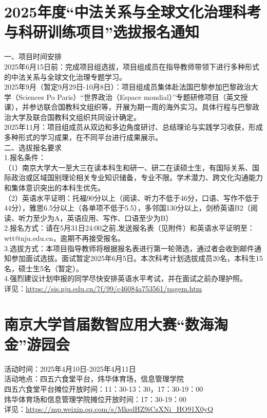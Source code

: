 \documentclass[letterpaper, 12pt]{article}
\begin{document}
\begin{multicols}{2}
\section{2025年度“中法关系与全球文化治理科考与科研训练项目”选拔报名通知}
一、项目时间安排
\\2025年6月15日前：完成项目组选拔，项目组成员在指导教师带领下进行多种形式的中法关系与全球文化治理专题学习。
\\2025年9月（暂定9月29日-10月8日）：项目组成员集体赴法国巴黎参加巴黎政治大学（Sciences Po Paris）“世界政治（Espace mondial）”专题研修项目（英文授课），并参访联合国教科文组织等，开展为期一周的海外实习。具体行程与巴黎政治大学及联合国教科文组织共同设计确定。
\\2025年11月：项目组成员从双边和多边角度研讨、总结理论与实践学习收获，形成多种形式的学习成果，在不同平台进行成果展示。
\\二、选拔报名要求
\\1.报名条件：
\\（1）南京大学大一至大三在读本科生和研一、研二在读硕士生，有国际关系、国际政治或区域国别理论相关专业知识储备，专业不限。学术潜力、跨文化沟通能力和集体意识突出的本科生优先。
\\（2）英语水平证明：托福90分以上（阅读、听力不低于46分，口语、写作不低于44分），雅思6.5分以上（各单项不低于5.5），多邻国130分以上，剑桥英语B2（阅读、听力至少为A，英语应用、写作、口语至少为B）
\\2.报名方式：请在5月31日24:00之前,发送报名表（见附件）和英语水平证明至：wtt@nju.edu.cn，逾期不再接受报名。
\\3.选拔方式：本项目指导教师将根据报名表进行第一轮筛选，通过者会收到邮件通知参加面试选拔。面试暂定2025年6月5日。本次科考计划选拔成员20名，本科生15名，硕士生5名（暂定）。
\\4.强烈建议计划申报的同学尽快安排英语水平考试，并在面试之前办理护照。
\\详见：\url{https://sis.nju.edu.cn/7f/99/c46084a753561/pagem.htm}

\section{南京大学首届数智应用大赛“数海淘金”游园会}
活动时间：2025年4月10日-2025年4月11日
\\活动地点：四五六食堂平台，炜华体育场，信息管理学院
\\四五六食堂平台摊位开放时间：11：30-13：30，17：30-19：00
\\炜华体育场和信息管理学院摊位开放时间：17：30-19：00
\\详见：\url{https://mp.weixin.qq.com/s/MksdHZ9iCzXNi_HO91X0yQ}


\end{multicols}
\end{document}
